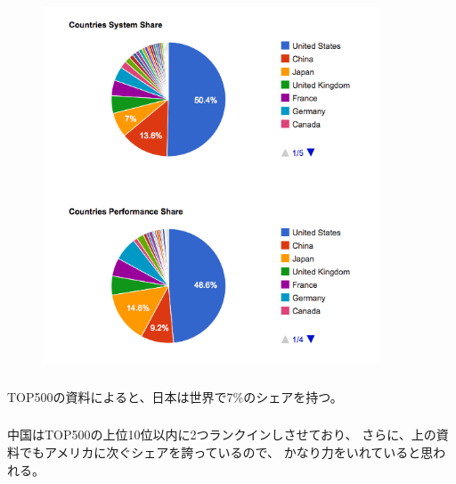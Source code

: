 \begin{figure}[htpb]
	\begin{center}
		\includegraphics[width=10cm]{2/img/jp.png}
	\end{center}
\end{figure}

\subsubsection{}
TOP500の資料によると、日本は世界で7\%のシェアを持つ。

\subsubsection{}
中国はTOP500の上位10位以内に2つランクインしさせており、
さらに、上の資料でもアメリカに次ぐシェアを誇っているので、
かなり力をいれていると思われる。
